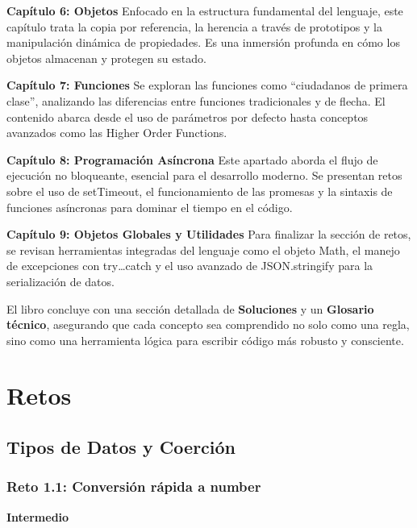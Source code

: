 \documentclass[
  letterpaper,
  DIV=11,
  numbers=noendperiod]{scrreprt}
\begin{document}
\textbf{Capítulo 6: Objetos} Enfocado en la estructura fundamental del
lenguaje, este capítulo trata la copia por referencia, la herencia a
través de prototipos y la manipulación dinámica de propiedades. Es una
inmersión profunda en cómo los objetos almacenan y protegen su estado.

\textbf{Capítulo 7: Funciones} Se exploran las funciones como
``ciudadanos de primera clase'', analizando las diferencias entre
funciones tradicionales y de flecha. El contenido abarca desde el uso de
parámetros por defecto hasta conceptos avanzados como las Higher Order
Functions.

\textbf{Capítulo 8: Programación Asíncrona} Este apartado aborda el
flujo de ejecución no bloqueante, esencial para el desarrollo moderno.
Se presentan retos sobre el uso de setTimeout, el funcionamiento de las
promesas y la sintaxis de funciones asíncronas para dominar el tiempo en
el código.

\textbf{Capítulo 9: Objetos Globales y Utilidades} Para finalizar la
sección de retos, se revisan herramientas integradas del lenguaje como
el objeto Math, el manejo de excepciones con try\ldots catch y el uso
avanzado de JSON.stringify para la serialización de datos.

El libro concluye con una sección detallada de \textbf{Soluciones} y un
\textbf{Glosario técnico}, asegurando que cada concepto sea comprendido
no solo como una regla, sino como una herramienta lógica para escribir
código más robusto y consciente.

\part{Retos}

\chapter{Tipos de Datos y Coerción}\label{tipos-de-datos-y-coerciuxf3n}

\section{Reto 1.1: Conversión rápida a number}\label{sec-cap1-reto1}

\begin{tcolorbox}[enhanced jigsaw, left=2mm, toprule=.15mm, leftrule=.75mm, breakable, colback=white, coltitle=black, bottomtitle=1mm, arc=.35mm, rightrule=.15mm, colframe=quarto-callout-caution-color-frame, opacitybacktitle=0.6, toptitle=1mm, opacityback=0, titlerule=0mm, title=\textcolor{quarto-callout-caution-color}{\faFire}\hspace{0.5em}{Dificultad}, bottomrule=.15mm, colbacktitle=quarto-callout-caution-color!10!white]

\textbf{Intermedio}

\end{tcolorbox}
\end{document}
